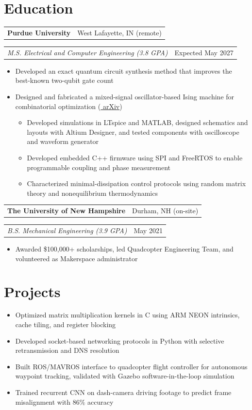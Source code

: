 \documentclass[11pt,a4paper,sans]{moderncv}
\makeatletter
\newlength{\entrygap}
\newcommand{\sectiongap}[0]{\vspace{-0.5cm}}
\newcommand{\company}[2]{%
  \par\addvspace{\entrygap}%
  \noindent\begin{tabular*}{\textwidth}{@{}l@{\extracolsep{\fill}}r@{}}%
    \textbf{#1} & #2
  \end{tabular*}\par
}
\newcommand{\role}[2]{%
  \par\noindent\begin{tabular*}{\textwidth}{@{}l@{\extracolsep{\fill}}r@{}}%
    \textit{#1} & #2
  \end{tabular*}\par
}
\makeatother
\begin{document}
\sectiongap

\section{Education}

\company{Purdue University}{West Lafayette, IN (remote)}
\role{M.S. Electrical and Computer Engineering (3.8 GPA)}{Expected May 2027}

\begin{itemize}

\item Developed an exact quantum circuit synthesis method that improves the best-known two-qubit gate count

\item Designed and fabricated a mixed-signal oscillator-based Ising machine for combinatorial optimization (\href{https://arxiv.org/abs/2512.23720}{\color{blue} arXiv})
\begin{itemize}
\item Developed simulations in LTspice and MATLAB, designed schematics and layouts with Altium Designer, and tested components with oscilloscope and waveform generator
\item Developed embedded C++ firmware using SPI and FreeRTOS to enable programmable coupling and phase measurement
\item Characterized minimal-dissipation control protocols using random matrix theory and nonequilibrium thermodynamics
\end{itemize}
\end{itemize}

\company{The University of New Hampshire}{Durham, NH (on-site)}
\role{B.S. Mechanical Engineering (3.9 GPA)}{May 2021}

\begin{itemize}
\item Awarded \$100,000+ scholarships, led Quadcopter Engineering Team, and volunteered as Makerspace administrator
\end{itemize}

\sectiongap

\section{Projects}

\begin{itemize}
\item Optimized matrix multiplication kernels in C using ARM NEON intrinsics, cache tiling, and register blocking
\item Developed socket-based networking protocols in Python with selective retransmission and DNS resolution
\item Built ROS/MAVROS interface to quadcopter flight controller for autonomous waypoint tracking, validated with Gazebo software-in-the-loop simulation
\item Trained recurrent CNN on dash-camera driving footage to predict frame misalignment with 86$\%$ accuracy
\end{itemize}
\end{document}
